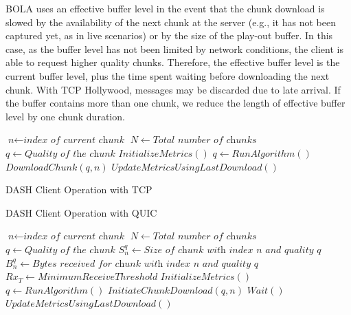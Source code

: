 BOLA uses an effective buffer level in the event that the chunk download is slowed by
the availability of the next chunk at the server (e.g., it has not been captured yet, as
in live scenarios) or by the size of the play-out buffer. In this case, as the buffer level has not
been limited by network conditions, the client is able to request higher quality chunks.
Therefore, the effective buffer level is the current buffer level, plus the time spent
waiting before downloading the next chunk. With TCP Hollywood, messages may be discarded
due to late arrival. If the buffer contains more than one chunk, we reduce the length of
effective buffer level by one chunk duration.


\begin{algorithm}
\begin{algorithmic}[1]
\State $\textit{n} \gets \textit{index of current chunk}$
\State $N \gets \textit{Total number of chunks}$
\State $q \gets \textit{Quality of the chunk}$
\State ${InitializeMetrics()}$
\State ${q \gets RunAlgorithm()}$
\State ${DownloadChunk(q, n)}$
\State ${UpdateMetricsUsingLastDownload()}$
\EndWhile
\EndProcedure
\end{algorithmic}
\caption{DASH Client Operation with TCP}\label{euclid}
\end{algorithm}
 

\begin{algorithm}
\caption{DASH Client Operation with QUIC}\label{euclid}
\begin{algorithmic}[1]
\State $\textit{n} \gets \textit{index of current chunk}$
\State $N \gets \textit{Total number of chunks}$
\State $q \gets \textit{Quality of the chunk}$
\State $S_n^q \gets \textit{Size of chunk with index n and quality q}$
\State $B_n^q  \gets \textit{Bytes received for chunk with index n and quality q }$
\State $Rx_T \gets Minimum Receive Threshold$
\State ${InitializeMetrics()}$
\State ${q \gets RunAlgorithm()}$
\State $InitiateChunkDownload(q, n)$
\State $Wait()$
\EndWhile
\State ${UpdateMetricsUsingLastDownload()}$
\EndWhile
\EndProcedure
\end{algorithmic}
\end{algorithm}



%
%
